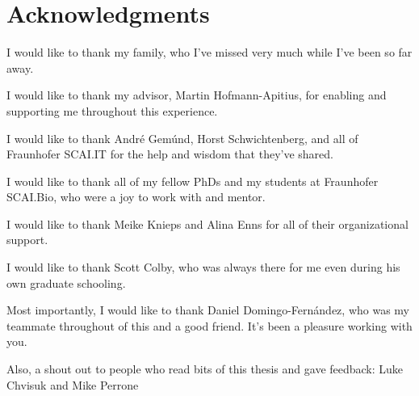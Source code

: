 \chapter*{Acknowledgments}

I would like to thank my family, who I've missed very much while I've been so far away.

I would like to thank my advisor, Martin Hofmann-Apitius, for enabling and supporting me throughout this experience.

I would like to thank Andr\'e Gem\'und, Horst Schwichtenberg, and all of Fraunhofer SCAI.IT for the help and wisdom that they've shared.

I would like to thank all of my fellow PhDs and my students at Fraunhofer SCAI.Bio, who were a joy to work with and mentor.

I would like to thank Meike Knieps and Alina Enns for all of their organizational support.

I would like to thank Scott Colby, who was always there for me even during his own graduate schooling.

Most importantly, I would like to thank Daniel Domingo-Fern\'{a}ndez, who was my teammate throughout of this and a good friend.
It's been a pleasure working with you.

\vspace*{\fill}

Also, a shout out to people who read bits of this thesis and gave feedback: Luke Chvisuk and Mike Perrone
